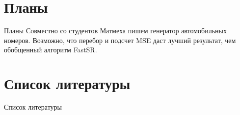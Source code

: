 
\section{Планы}
\begin{frame}{Планы}
  Совместно со студентов Матмеха пишем генератор автомобильных номеров. Возможно, что перебор и подсчет MSE даст лучший
  результат, чем обобщенный алгоритм FastSR.
\end{frame}

\section{Список литературы}
\begin{frame}[allowframebreaks]{Список литературы}
\nocite{suresh2007superresolution}
\nocite{tian2011survey}
\nocite{gonzalez2002woods}


\end{frame}
